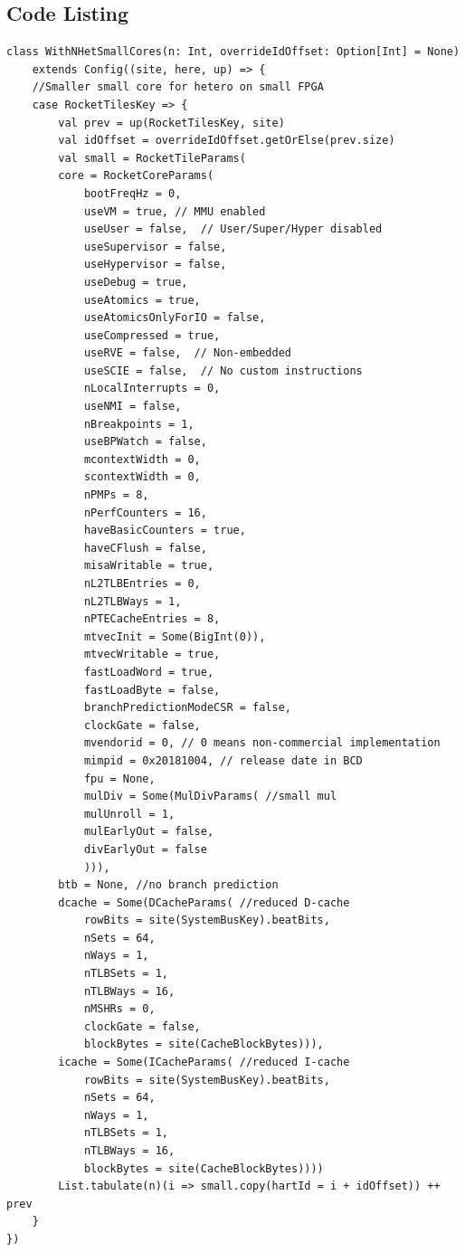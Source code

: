 \subsection{Code Listing}
\begin{verbatim}
class WithNHetSmallCores(n: Int, overrideIdOffset: Option[Int] = None) 
    extends Config((site, here, up) => { 
    //Smaller small core for hetero on small FPGA
    case RocketTilesKey => {
        val prev = up(RocketTilesKey, site)
        val idOffset = overrideIdOffset.getOrElse(prev.size)
        val small = RocketTileParams(
        core = RocketCoreParams(
            bootFreqHz = 0,
            useVM = true, // MMU enabled
            useUser = false,  // User/Super/Hyper disabled
            useSupervisor = false,
            useHypervisor = false,
            useDebug = true,
            useAtomics = true,
            useAtomicsOnlyForIO = false,
            useCompressed = true,
            useRVE = false,  // Non-embedded
            useSCIE = false,  // No custom instructions
            nLocalInterrupts = 0,
            useNMI = false,
            nBreakpoints = 1,
            useBPWatch = false,
            mcontextWidth = 0,
            scontextWidth = 0,
            nPMPs = 8,
            nPerfCounters = 16,
            haveBasicCounters = true,
            haveCFlush = false,
            misaWritable = true,
            nL2TLBEntries = 0,
            nL2TLBWays = 1,
            nPTECacheEntries = 8,
            mtvecInit = Some(BigInt(0)),
            mtvecWritable = true,
            fastLoadWord = true,
            fastLoadByte = false,
            branchPredictionModeCSR = false,
            clockGate = false,
            mvendorid = 0, // 0 means non-commercial implementation
            mimpid = 0x20181004, // release date in BCD
            fpu = None, 
            mulDiv = Some(MulDivParams( //small mul
            mulUnroll = 1,
            mulEarlyOut = false,
            divEarlyOut = false
            ))),
        btb = None, //no branch prediction
        dcache = Some(DCacheParams( //reduced D-cache
            rowBits = site(SystemBusKey).beatBits,
            nSets = 64,
            nWays = 1,
            nTLBSets = 1,
            nTLBWays = 16,
            nMSHRs = 0,
            clockGate = false,
            blockBytes = site(CacheBlockBytes))),
        icache = Some(ICacheParams( //reduced I-cache
            rowBits = site(SystemBusKey).beatBits,
            nSets = 64,
            nWays = 1,
            nTLBSets = 1,
            nTLBWays = 16,
            blockBytes = site(CacheBlockBytes))))
        List.tabulate(n)(i => small.copy(hartId = i + idOffset)) ++ prev
    }
})
\end{verbatim}

